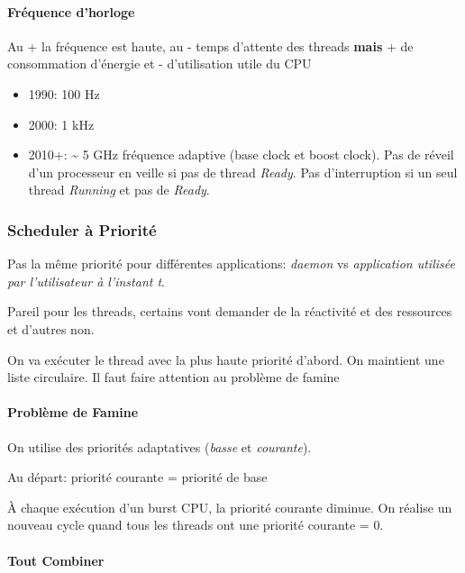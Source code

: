 \paragraph{Fréquence d'horloge}\label{fruxe9quence-dhorloge}

Au + la fréquence est haute, au - temps d'attente des threads
\textbf{mais} + de consommation d'énergie et - d'utilisation utile du
CPU

\begin{itemize}
\tightlist
\item
  1990: 100 Hz
\item
  2000: 1 kHz
\item
  2010+: \textasciitilde{} 5 GHz fréquence adaptive (base clock et boost
  clock). Pas de réveil d'un processeur en veille si pas de thread
  \emph{Ready}. Pas d'interruption si un seul thread \emph{Running} et
  pas de \emph{Ready}.
\end{itemize}

\subsubsection{Scheduler à Priorité}\label{scheduler-uxe0-priorituxe9}

Pas la même priorité pour différentes applications: \emph{daemon} vs
\emph{application utilisée par l'utilisateur à l'instant t}.

Pareil pour les threads, certains vont demander de la réactivité et des
ressources et d'autres non.

On va exécuter le thread avec la plus haute priorité d'abord. On
maintient une liste circulaire. Il faut faire attention au problème de
famine

\paragraph{Problème de Famine}\label{probluxe8me-de-famine}

On utilise des priorités adaptatives (\emph{basse} et \emph{courante}).

Au départ: priorité courante = priorité de base

À chaque exécution d'un burst CPU, la priorité courante diminue. On
réalise un nouveau cycle quand tous les threads ont une priorité
courante = 0.

\paragraph{Tout Combiner}\label{tout-combiner}

